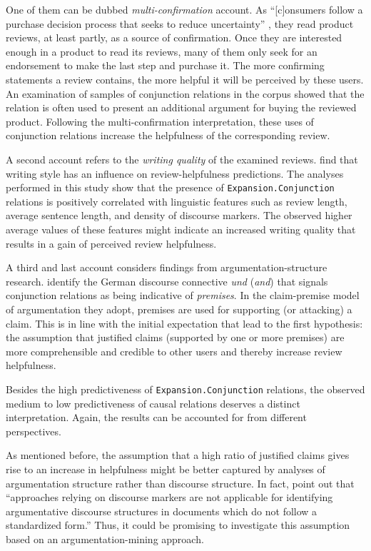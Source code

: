 \documentclass[
    a4paper,%
    12pt,%
    oneside,%
    toc=bibliography,
    final,
]{scrartcl}
\begin{document}
One of them can be dubbed \textit{multi-confirmation} account. As “[c]onsumers follow a purchase decision process that seeks to reduce uncertainty” \citep[187]{MudambiSchuff2010}, they read product reviews, at least partly, as a source of confirmation. Once they are interested enough in a product to read its reviews, many of them only seek for an endorsement to make the last step and purchase it. The more confirming statements a review contains, the more helpful it will be perceived by these users. An examination of samples of conjunction relations in the corpus showed that the relation is often used to present an additional argument for buying the reviewed product. Following the multi-confirmation interpretation, these uses of conjunction relations increase the helpfulness of the corresponding review.

A second account refers to the \textit{writing quality} of the examined reviews. \citet{Liu2008} find that writing style has an influence on review-helpfulness predictions. The analyses performed in this study show that the presence of \lstinline|Expansion.Conjunction| relations is positively correlated with linguistic features such as review length, average sentence length, and density of discourse markers. The observed higher average values of these features might indicate an increased writing quality that results in a gain of perceived review helpfulness.

A third and last account considers findings from argumentation-structure research. \citet[2239]{Eckle-Kohler2015} identify the German discourse connective \textit{und} (\textit{and}) that signals conjunction relations as being indicative of \textit{premises}. In the claim-premise model of argumentation they adopt, premises are used for supporting (or attacking) a claim. This is in line with the initial expectation that lead to the first hypothesis: the assumption that justified claims (supported by one or more premises) are more comprehensible and credible to other users and thereby increase review helpfulness.


Besides the high predictiveness of \lstinline|Expansion.Conjunction| relations, the observed medium to low predictiveness of causal relations deserves a distinct interpretation. Again, the results can be accounted for from different perspectives.

As mentioned before, the assumption that a high ratio of justified claims gives rise to an increase in helpfulness might be better captured by analyses of argumentation structure rather than discourse structure. In fact, \citet[54]{StabGurevych2014} point out that “approaches relying on discourse markers are not applicable for identifying argumentative discourse structures in documents which do not follow a standardized form.” Thus, it could be promising to investigate this assumption based on an argumentation-mining approach.
\end{document}
